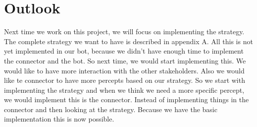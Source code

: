 \section{Outlook}
Next time we work on this project, we will focus on implementing the strategy. The complete strategy we want to have is described in appendix A. All this is not yet implemented in our bot, because we didn't have enough time to implement the connector and the bot. So next time, we would start implementing this. We would like to have more interaction with the other stakeholders. Also we would like te connector to have more percepts based on our strategy. So we start with implementing the strategy and when we think we need a more specific percept, we would implement this is the connector. Instead of implementing things in the connector and then looking at the strategy. Because we have the basic implementation this is now possible.

\newpage